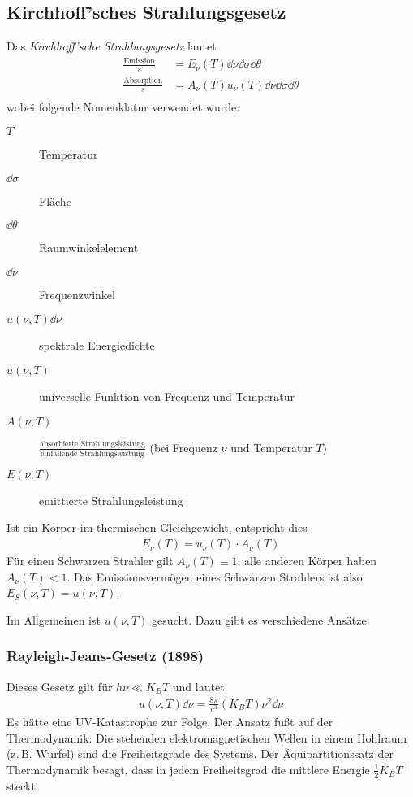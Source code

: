 \subsection{Kirchhoff'sches Strahlungsgesetz}%
Das \emph{Kirchhoff'sche Strahlungsgesetz} lautet
\begin{align*}
  \frac{\text{Emission}}{s} &= E_\nu(T) \dd\nu \dd\sigma \dd\theta\\
  \frac{\text{Absorption}}{s} &= A_\nu(T)u_\nu(T) \dd\nu \dd\sigma \dd\theta\\
\end{align*}
wobei folgende Nomenklatur verwendet wurde:
\begin{description}
\item[$T$] Temperatur
\item[$\dd\sigma$] Fläche
\item[$\dd\theta$] Raumwinkelelement
\item[$\dd\nu$] Frequenzwinkel
\item[$u(\nu,T)\dd\nu$] spektrale Energiedichte
\item[$u(\nu,T)$] universelle Funktion von Frequenz und Temperatur
\item[$A(\nu,T)$] 
  $\frac{\text{absorbierte Strahlungsleistung}}
  {\text{einfallende Strahlungsleistung}}$ (bei Frequenz $\nu$ und
  Temperatur $T$)%
\item[$E(\nu,T)$] emittierte Strahlungsleistung
\end{description}
Ist ein Körper im thermischen Gleichgewicht, entspricht dies
\begin{gather*}
  E_\nu(T) = u_\nu(T)\cdot A_\nu(T)
\end{gather*}
Für einen Schwarzen Strahler gilt $A_\nu(T)\equiv 1$, alle anderen
Körper haben $A_\nu(T)<1$. Das Emissionsvermögen eines Schwarzen
Strahlers ist also $E_S(\nu,T) = u(\nu,T)$.

Im Allgemeinen ist $u(\nu,T)$ gesucht. Dazu gibt es verschiedene
Ansätze.

\subsubsection{Rayleigh-Jeans-Gesetz (1898)}
Dieses Gesetz gilt für 
$h\nu\ll K_B T$
und lautet
\begin{gather*}
  u(\nu,T)\dd\nu = \frac{8\pi}{c^3}(K_BT)\nu^2\dd\nu
\end{gather*}
Es hätte eine UV-Katastrophe zur Folge.
Der Ansatz fußt auf der Thermodynamik: 
Die stehenden elektromagnetischen Wellen in einem Hohlraum (z.\,B. Würfel)
sind die Freiheitsgrade des Systems. Der Äquipartitionssatz der
Thermodynamik besagt, dass in jedem Freiheitsgrad die mittlere Energie
$\frac{1}{2}K_BT$ steckt.

